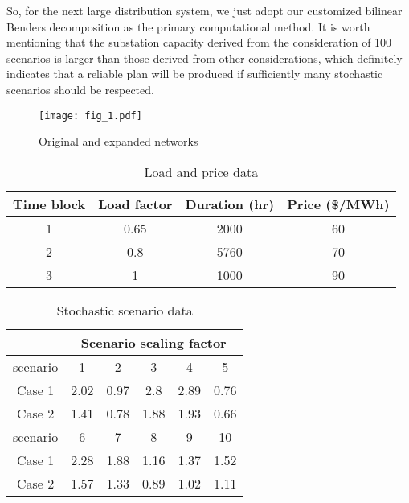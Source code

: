 \documentclass[journal]{IEEEtran}
\theoremstyle{remark}
\begin{document}
So, for the next large distribution system, we just adopt our customized bilinear Benders decomposition as the primary computational method. It is worth mentioning that
 the  substation capacity derived from the consideration of 100 scenarios is larger than those derived from other considerations, which definitely indicates that a reliable plan will be produced if sufficiently many stochastic scenarios should be respected. \\


\begin{figure}[t]
\centering
\texttt{[image: fig\_1.pdf]}
\caption{Original and expanded networks}
\label{fig_1}
\end{figure}


\begin{table}[htbp]
  \renewcommand{\arraystretch}{1.0}
  \centering
  \caption{Load and price data}
  \label{table_I}
    \begin{tabular}{cccc}
    \toprule
    Time block & Load factor & Duration (hr) & Price (\$/MWh) \\
    \midrule
    1     & 0.65  & 2000  & 60 \\
    2     & 0.8   & 5760  & 70 \\
    3     & 1     & 1000  & 90 \\
    \bottomrule
    \end{tabular}%
  \label{tab:addlabel}%
\end{table}%


\begin{table}[htbp]
\renewcommand{\arraystretch}{1.1}
  \centering
  \caption{Stochastic scenario data}
  \label{table_II}
    \begin{tabular}{cccccc}
    \toprule
          & \multicolumn{5}{c}{Scenario scaling factor} \\
    \midrule
    scenario & 1     & 2     & 3     & 4     & 5 \\
    Case 1 & 2.02  & 0.97  & 2.8   & 2.89  & 0.76 \\
    Case 2 & 1.41  & 0.78  & 1.88  & 1.93  & 0.66 \\
        \midrule
    scenario & 6     & 7     & 8     & 9     & 10 \\

    Case 1 & 2.28  & 1.88  & 1.16  & 1.37  & 1.52 \\
    Case 2 & 1.57  & 1.33  & 0.89  & 1.02  & 1.11 \\
    \bottomrule
    \end{tabular}%
  \label{tab:addlabel}%
\end{table}%
\end{document}
